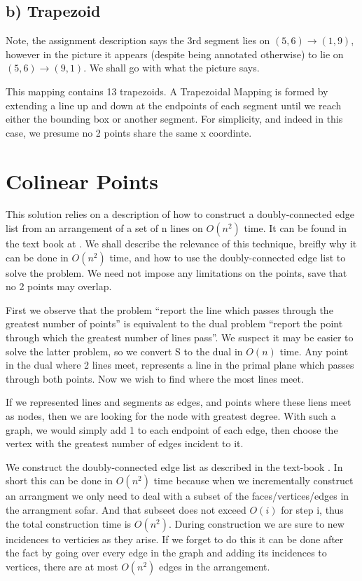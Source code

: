 \documentclass{article}
\begin{document}
\subsection{b) Trapezoid}
Note, the assignment description says the 3rd segment lies on $(5,6) \rightarrow (1,9)$, however in the picture it appears (despite being annotated otherwise) to lie on $(5,6) \rightarrow (9,1)$.
We shall go with what the picture says.

This mapping contains 13 trapezoids.
A Trapezoidal Mapping is formed by extending a line up and down at the endpoints of each segment until we reach either the bounding box or another segment.
For simplicity, and indeed in this case, we presume no 2 points share the same x coordinte.

\section {Colinear Points}

This solution relies on a description of how to construct a doubly-connected edge list from an arrangement of a set of n lines on $O(n^2)$ time.
It can be found in the text book at \cite{tb}.
We shall describe the relevance of this technique, breifly why it can be done in $O(n^2)$ time, and how to use the doubly-connected edge list to solve the problem.
We need not impose any limitations on the points, save that no 2 points may overlap.

First we observe that the problem ``report the line which passes through the greatest number of points'' is equivalent to the dual problem ``report the point through which the greatest number of lines pass''.
We suspect it may be easier to solve the latter problem, so we convert S to the dual in $O(n)$ time.
Any point in the dual where 2 lines meet, represents a line in the primal plane which passes through both points.
Now we wish to find where the most lines meet.

If we represented lines and segments as edges, and points where these liens meet as nodes, then we are looking for the node with greatest degree.
With such a graph, we would simply add 1 to each endpoint of each edge, then choose the vertex with the greatest number of edges incident to it.

We construct the doubly-connected edge list as described in the text-book \cite{tb}.
In short this can be done in $O(n^2)$ time because when we incrementally construct an arrangment we only need to deal with a subset of the faces/vertices/edges in the arrangment sofar.
And that subseet does not exceed $O(i)$ for step i, thus the total construction time is $O(n^2)$.
During construction we are sure to new incidences to verticies as they arise.
If we forget to do this it can be done after the fact by going over every edge in the graph and adding its incidences to vertices, there are at most $O(n^2)$ edges in the arrangement.
\end{document}
